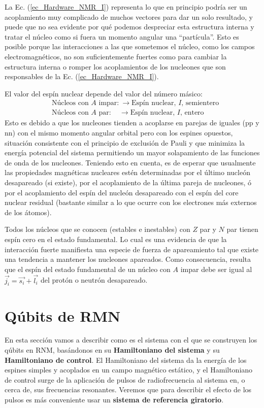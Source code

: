 \documentclass[a4paper,11pt]{book} %
\numberwithin{equation}{chapter}
\begin{document}
La Ec. (\ref{ec_Hardware_NMR_I}) representa lo que en principio podría ser un acoplamiento muy complicado de muchos vectores para dar un solo resultado, y puede que no sea evidente por qué podemos despreciar esta estructura interna y tratar el núcleo como si fuera un momento angular una ``partícula''. Esto es posible porque las interacciones a las que sometemos el núcleo, como los campos electromagnéticos, no son suficientemente fuertes como para cambiar la estructura interna o romper los acoplamientos de los nucleones que son responsables de la Ec. (\ref{ec_Hardware_NMR_I}). 

El valor del espín nuclear depende del valor del número másico:
\begin{align*}
& \text{Núcleos con }A \text{ impar:} ~ \longrightarrow \text{Espín nuclear, } I \text{, semientero}   \\
& \text{Núcleos con }A \text{ par:} ~~~ \,\, \, \longrightarrow \text{Espín nuclear, } I \text{, entero}
\end{align*}
Esto es debido a que los nucleones tienden a acoplarse en parejas de iguales (pp y nn) con el mismo momento angular orbital pero con los espines opuestos, situación consistente con el principio de exclusión de Pauli y que minimiza la energía potencial del sistema permitiendo un mayor solapamiento de las funciones de onda de los nucleones. Teniendo esto en cuenta, es de esperar que usualmente las propiedades magnéticas nucleares estén determinadas por el último nucleón desapareado (si existe), por el acoplamiento de la última pareja de nucleones, ó por el acoplamiento del espín del nucleón desapareado con el espín del core nuclear residual (bastante similar a lo que ocurre con los electrones más externos de los átomos).

Todos los núcleos que se conocen (estables e inestables) con $Z$ par y $N$ par tienen espín cero en el estado fundamental. Lo cual es una evidencia de que la interacción fuerte manifiesta una especie de fuerza de apareamiento tal que existe una tendencia a mantener los nucleones apareados. Como consecuencia, resulta que el espín del estado fundamental de un núcleo con $A$ impar debe ser igual al $\vec{j_i} = \vec{s_i} + \vec{l_i}$ del protón o neutrón desapareado.


	
	\section{Qúbits de RMN} 

En esta sección vamos a describir como es el sistema con el que se construyen los qúbits en RNM, basándonos en su \textbf{Hamiltoniano del sistema} y su \textbf{Hamiltoniano de control}. El Hamiltoniano del sistema da la energía de los espines simples y acoplados en un campo magnético estático, y el Hamiltoniano de control surge de la aplicación de pulsos de radiofrecuencia al sistema en, o cerca de, sus frecuencias resonantes. Veremos que para describir el efecto de los pulsos es más conveniente usar un \textbf{sistema de referencia giratorio}.
\end{document}
